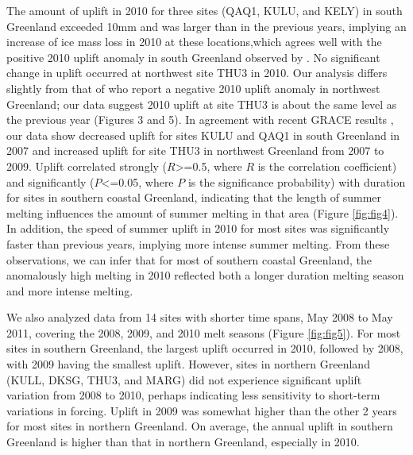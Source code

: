 The amount of uplift in 2010 for three sites
(QAQ1, KULU, and KELY) in south Greenland
exceeded 10mm and was larger than in the previous
years, implying an increase of ice mass loss in 2010
at these locations,which agrees well with the positive
2010 uplift anomaly in south Greenland observed
by \cite{bevis2012bedrock}. No significant change in
uplift occurred at northwest site THU3 in 2010.
Our analysis differs slightly from that of \cite{bevis2012bedrock} who report a negative 2010 uplift anomaly
in northwest Greenland; our data suggest 2010 uplift
at site THU3 is about the same level as the previous
year (Figures 3 and 5). In agreement with recent
GRACE results \cite[]{schrama2011revisiting,chen2011interannual,khan2010spread}, our data show
decreased uplift for sites KULU and QAQ1 in south
Greenland in 2007 and increased uplift for site
THU3 in northwest Greenland from 2007 to
2009. Uplift correlated strongly ($R$>=0.5, where
$R$ is the correlation coefficient) and significantly
($P$<=0.05, where $P$ is the significance probability)
with duration for sites in southern coastal Greenland,
indicating that the length of summer melting
influences the amount of summer melting in that
area (Figure \ref{fig:fig4}). In addition, the speed of summer
uplift in 2010 for most sites was significantly faster
than previous years, implying more intense summer
melting. From these observations, we can infer that
for most of southern coastal Greenland, the anomalously
high melting in 2010 reflected both a longer
duration melting season and more intense melting.

We also analyzed data from 14 sites with shorter
time spans, May 2008 to May 2011, covering
the 2008, 2009, and 2010 melt seasons (Figure \ref{fig:fig5}).
For most sites in southern Greenland, the largest
uplift occurred in 2010, followed by 2008, with 2009
having the smallest uplift. However, sites
in northern Greenland (KULL, DKSG, THU3, and
MARG) did not experience significant uplift variation
from 2008 to 2010, perhaps indicating less sensitivity
to short-term variations in forcing. Uplift in 2009 was
somewhat higher than the other 2 years for most sites
in northern Greenland. On average, the annual uplift
in southern Greenland is higher than that in northern
Greenland, especially in 2010.

